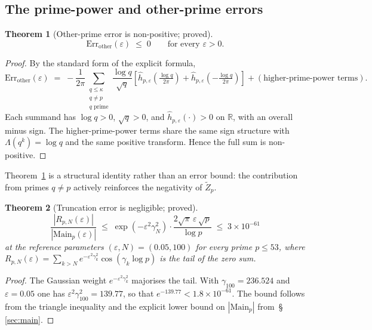 \documentclass[11pt]{article}
\newtheorem{theorem}{Theorem}[section]
\newcommand{\Zt}{\widetilde{Z}}
\begin{document}
\subsection{The prime-power and other-prime errors}

\begin{theorem}[Other-prime error is non-positive; proved]
\label{thm:other}
\[
\mathrm{Err}_{\mathrm{other}}(\varepsilon) \;\le\; 0 \qquad
\text{for every } \varepsilon>0.
\]
\end{theorem}

\begin{proof}
By the standard form of the explicit formula,
\[
\mathrm{Err}_{\mathrm{other}}(\varepsilon) \;=\; -\frac{1}{2\pi}
\sum_{\substack{q\le\kappa\\ q\neq p\\ q\text{ prime}}}
\frac{\log q}{\sqrt q}
\!\left[\widehat{h}_{p,\varepsilon}\!\left(\tfrac{\log q}{2\pi}\right)
      +\widehat{h}_{p,\varepsilon}\!\left(-\tfrac{\log q}{2\pi}\right)
\right]
+ (\text{higher-prime-power terms}).
\]
Each summand has $\log q>0$, $\sqrt q>0$, and
$\widehat{h}_{p,\varepsilon}(\cdot)>0$ on $\mathbb R$, with an overall
minus sign.
The higher-prime-power terms share the same sign structure with
$\Lambda(q^k)=\log q$ and the same positive transform.
Hence the full sum is non-positive.
\end{proof}

Theorem~\ref{thm:other} is a structural identity rather than an error
bound: the contribution from primes $q\neq p$ actively reinforces the
negativity of $\Zt_p$.

\begin{theorem}[Truncation error is negligible; proved]
\label{thm:trunc}
\[
\frac{|R_{p,N}(\varepsilon)|}{|\mathrm{Main}_p(\varepsilon)|}
\;\le\; \exp(-\varepsilon^2\gamma_N^2)\cdot
       \frac{2\sqrt\pi\,\varepsilon\,\sqrt p}{\log p}
\;\le\; 3\times 10^{-61}
\]
at the reference parameters $(\varepsilon,N)=(0.05,100)$ for every
prime $p\le 53$, where $R_{p,N}(\varepsilon)=\sum_{k>N}
e^{-\varepsilon^2\gamma_k^2}\cos(\gamma_k\log p)$ is the tail of the
zero sum.
\end{theorem}

\begin{proof}
The Gaussian weight $e^{-\varepsilon^2\gamma_k^2}$ majorises the tail.
With $\gamma_{100}=236.524$ and $\varepsilon=0.05$ one has
$\varepsilon^2\gamma_{100}^2=139.77$, so that $e^{-139.77}<1.8\times 10^{-61}$.
The bound follows from the triangle inequality and the explicit lower
bound on $|\mathrm{Main}_p|$ from~\S\,\ref{sec:main}.
\end{proof}
\end{document}
